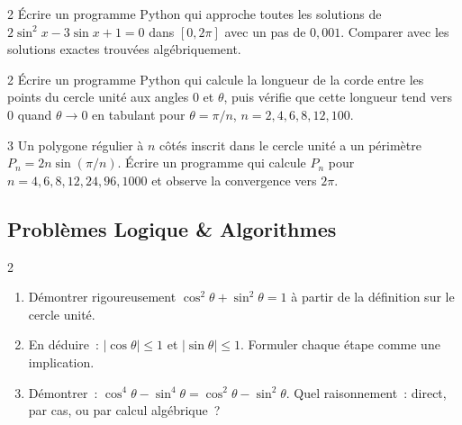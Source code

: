 \begin{exo}{2}
\'Ecrire un programme Python qui approche toutes les solutions
de $2\sin^2x-3\sin x+1=0$ dans $[0,2\pi]$ avec un pas de $0{,}001$.
Comparer avec les solutions exactes trouv\'ees alg\'ebriquement.
\end{exo}

\begin{exo}{2}
\'Ecrire un programme Python qui calcule la longueur de la corde
entre les points du cercle unit\'e aux angles $0$ et $\theta$,
puis v\'erifie que cette longueur tend vers $0$ quand $\theta\to0$
en tabulant pour $\theta=\pi/n$, $n=2,4,6,8,12,100$.
\end{exo}

\begin{exo}{3}
Un polygone r\'egulier \`a $n$ c\^ot\'es inscrit dans le cercle unit\'e a un
p\'erim\`etre $P_n=2n\sin(\pi/n)$.
\'Ecrire un programme qui calcule $P_n$ pour $n=4,6,8,12,24,96,1000$
et observe la convergence vers $2\pi$.
\end{exo}

\subsection*{Probl\`emes Logique \& Algorithmes}

\begin{probleme}{2}
\begin{enumerate}
  \item D\'emontrer rigoureusement $\cos^2\theta+\sin^2\theta=1$
        \`a partir de la d\'efinition sur le cercle unit\'e.
  \item En d\'eduire~: $|\cos\theta|\leq1$ et $|\sin\theta|\leq1$.
        Formuler chaque \'etape comme une implication.
  \item D\'emontrer~: $\cos^4\theta-\sin^4\theta=\cos^2\theta-\sin^2\theta$.
        Quel raisonnement~: direct, par cas, ou par calcul alg\'ebrique~?
\end{enumerate}
\end{probleme}

